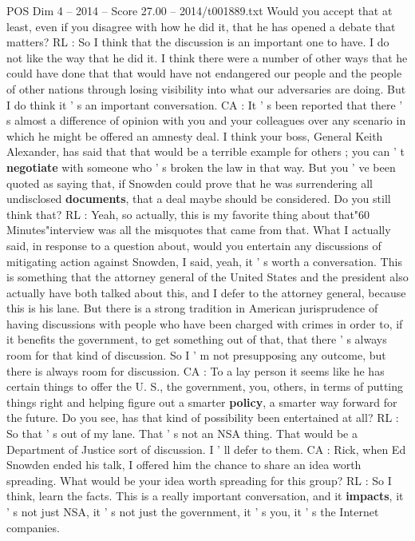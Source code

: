 \begin{textsample}{POS Dim 4 – 2014 – Score 27.00 – 2014/t001889.txt}
Would you accept that at least, even if you disagree with how he did it, that he has opened a debate that matters?
RL : So I think that the discussion is an important one to have.
I do not like the way that he did it.
I think there were a number of other ways that he could have done that that would have not endangered our people and the people of other nations through losing visibility into what our adversaries are doing.
But I do think it ' s an important conversation.
CA : It ' s been reported that there ' s almost a difference of opinion with you and your colleagues over any scenario in which he might be offered an amnesty deal.
I think your boss, General Keith Alexander, has said that that would be a terrible example for others ; you can ' t \textbf{negotiate} with someone who ' s broken the law in that way.
But you ' ve been quoted as saying that, if Snowden could prove that he was surrendering all undisclosed \textbf{documents}, that a deal maybe should be considered.
Do you still think that?
RL : Yeah, so actually, this is my favorite thing about that"60 Minutes"interview was all the misquotes that came from that.
What I actually said, in response to a question about, would you entertain any discussions of mitigating action against Snowden, I said, yeah, it ' s worth a conversation.
This is something that the attorney general of the United States and the president also actually have both talked about this, and I defer to the attorney general, because this is his lane.
But there is a strong tradition in American jurisprudence of having discussions with people who have been charged with crimes in order to, if it benefits the government, to get something out of that, that there ' s always room for that kind of discussion.
So I ' m not presupposing any outcome, but there is always room for discussion.
CA : To a lay person it seems like he has certain things to offer the U.
S., the government, you, others, in terms of putting things right and helping figure out a smarter \textbf{policy}, a smarter way forward for the future.
Do you see, has that kind of possibility been entertained at all?
RL : So that ' s out of my lane.
That ' s not an NSA thing.
That would be a Department of Justice sort of discussion.
I ' ll defer to them.
CA : Rick, when Ed Snowden ended his talk, I offered him the chance to share an idea worth spreading.
What would be your idea worth spreading for this group?
RL : So I think, learn the facts.
This is a really important conversation, and it \textbf{impacts}, it ' s not just NSA, it ' s not just the government, it ' s you, it ' s the Internet companies.

\end{textsample}
